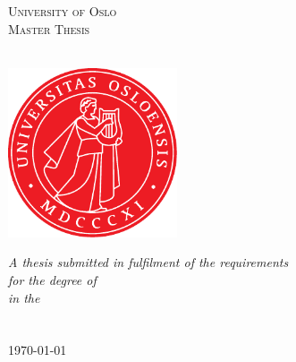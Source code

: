 \documentclass[11pt, oneside]{Thesis} %
\begin{document}
\begin{titlepage}
\begin{center}

\textsc{\LARGE University of Oslo}\\[1.5cm] %
\textsc{\Large Master Thesis}\\[0.5cm] %
  \vspace{10mm}          %
{\huge \bfseries \ttitle}\\[0.4cm] %
 
 \vspace{15mm}
 \centerline{\includegraphics[width=5cm,height=5cm]{figures/apollonseglet/Apollonseglet/UiO_Segl_cmyk.pdf}}
\vspace{15mm}
\large \textit{A thesis submitted in fulfilment of the requirements\\ for the degree of \degreename}\\[0.3cm] 
\textit{in the}\\[0.4cm]
\groupname\\\deptname\\[2cm] %
 
{\large \today}\\[4cm] %

 
\vfill
\end{center}

\end{titlepage}
\end{document}
